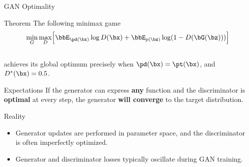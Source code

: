 \documentclass{beamer}
\begin{document}
\begin{frame}{GAN Optimality}
	\begin{block}{Theorem}
		The following minimax game 
		\vspace{-0.3cm}
		\[
		\min_{G} \max_D \Bigl[ \bbE_{\pd(\bx)} \log D(\bx) + \bbE_{p(\bz)} \log (1 - D(\bG(\bz))) \Bigr]
		\]
		\vspace{-0.5cm} \\
		achieves its global optimum precisely when $\pd(\bx) = \pt(\bx)$, and $D^*(\bx) = 0.5$.
	\end{block}
	\vspace{-0.2cm}
	\begin{block}{Expectations}
		If the generator can express \textbf{any} function and the discriminator is \textbf{optimal} at every step, the generator \textbf{will converge} to the target distribution.
	\end{block}
	\vspace{-0.3cm}
	\eqpause
	\begin{block}{Reality}
		\begin{itemize}
			\item Generator updates are performed in parameter space, and the discriminator is often imperfectly optimized.
			\item Generator and discriminator losses typically oscillate during GAN training.
		\end{itemize}
	\end{block}
\end{frame}
\end{document}

